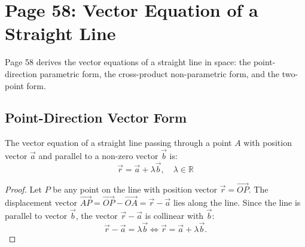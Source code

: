 \section{Page 58: Vector Equation of a Straight Line}
\label{sec:page58}

\begin{conceptbox}
Page 58 derives the vector equations of a straight line in space: the point-direction parametric form, the cross-product non-parametric form, and the two-point form.
\end{conceptbox}

\subsection{Point-Direction Vector Form}
\begin{theorembox}
The vector equation of a straight line passing through a point $A$ with position vector $\vec{a}$ and parallel to a non-zero vector $\vec{b}$ is:
\begin{equation}
    \boxed{\vec{r} = \vec{a} + \lambda \vec{b}, \quad \lambda \in \mathbb{R}}
\end{equation}
\end{theorembox}

\begin{proof}
Let $P$ be any point on the line with position vector $\vec{r} = \vec{OP}$.
The displacement vector $\vec{AP} = \vec{OP} - \vec{OA} = \vec{r} - \vec{a}$ lies along the line.
Since the line is parallel to vector $\vec{b}$, the vector $\vec{r} - \vec{a}$ is collinear with $\vec{b}$:
\begin{equation}
    \vec{r} - \vec{a} = \lambda \vec{b} \iff \vec{r} = \vec{a} + \lambda \vec{b}.
\end{equation}
\end{proof}

\begin{center}
\end{center}

